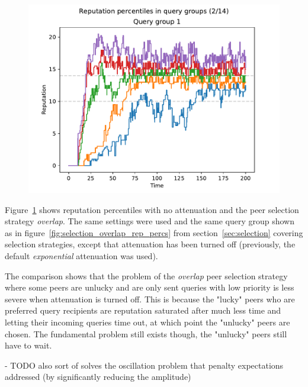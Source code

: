 \begin{figure}[t]
\centering
\includegraphics[width=1\columnwidth]{figures/attenuation_no_attenuation_selection_overlap_rep_percs_2_of_14}
\label{fig:attenuation_no_att_selection_overlap_rep_percs}
\end{figure}

Figure~\ref{fig:attenuation_no_att_selection_overlap_rep_percs} shows reputation
percentiles with no attenuation and the peer selection strategy \emph{overlap}.
The same settings were used and the same query group shown as in
figure~\ref{fig:selection_overlap_rep_percs} from section~\ref{sec:selection}
covering selection strategies, except that attenuation has been turned off
(previously, the default \emph{exponential} attenuation was used).

The comparison shows that the problem of the \emph{overlap} peer selection
strategy where some peers are unlucky and are only sent queries with low
priority is less severe when attenuation is turned off. This is because the
"lucky" peers who are preferred query recipients are reputation saturated after
much less time and letting their incoming queries time out, at which point the
"unlucky" peers are chosen. The fundamental problem still exists though, the
"unlucky" peers still have to wait.

- TODO also sort of solves the oscillation problem that penalty expectations
  addressed (by significantly reducing the amplitude)

